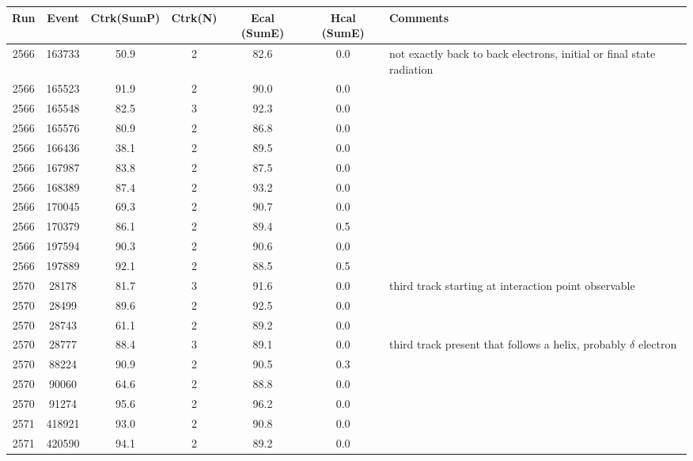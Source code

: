 \begin{tabular}{ccccccl}
	\toprule
	Run & Event & Ctrk(SumP) & Ctrk(N) & Ecal (SumE) & Hcal (SumE) & Comments \\
	\midrule
	2566 & 163733 & 50.9       & 2       & 82.6       & 0.0        &  not exactly back to back electrons, initial or final state radiation\\
	2566 & 165523 & 91.9       & 2       & 90.0       & 0.0        &  \\
	2566 & 165548 & 82.5       & 3       & 92.3       & 0.0        &  \\
	2566 & 165576 & 80.9       & 2       & 86.8       & 0.0        &  \\
	2566 & 166436 & 38.1       & 2       & 89.5       & 0.0        &  \\
	2566 & 167987 & 83.8       & 2       & 87.5       & 0.0        &  \\
	2566 & 168389 & 87.4       & 2       & 93.2       & 0.0        &  \\
	2566 & 170045 & 69.3       & 2       & 90.7       & 0.0        &  \\
	2566 & 170379 & 86.1       & 2       & 89.4       & 0.5        &  \\
	2566 & 197594 & 90.3       & 2       & 90.6       & 0.0        &  \\
	2566 & 197889 & 92.1       & 2       & 88.5       & 0.5        &  \\
	2570 & 28178  & 81.7       & 3       & 91.6       & 0.0        &  third track starting at interaction point observable\\
	2570 & 28499  & 89.6       & 2       & 92.5       & 0.0        &  \\
	2570 & 28743  & 61.1       & 2       & 89.2       & 0.0        &  \\
	2570 & 28777  & 88.4       & 3       & 89.1       & 0.0        &  third track present that follows a helix, probably $\delta$ electron\\
	2570 & 88224  & 90.9       & 2       & 90.5       & 0.3        &  \\
	2570 & 90060  & 64.6       & 2       & 88.8       & 0.0        &  \\
	2570 & 91274  & 95.6       & 2       & 96.2       & 0.0        &  \\
	2571 & 418921 & 93.0       & 2       & 90.8       & 0.0        &  \\
	2571 & 420590 & 94.1       & 2       & 89.2       & 0.0        &  \\
	\bottomrule
\end{tabular}